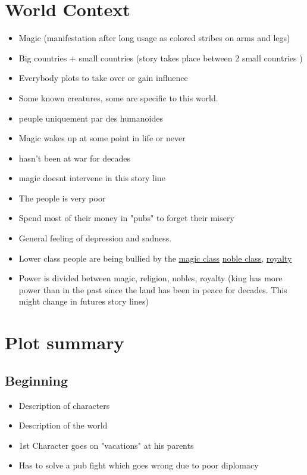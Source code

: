 \documentclass{article}
\begin{document}
\section{World Context}
\begin{itemize}
\item{Magic (manifestation after long usage as colored stribes on arms and legs)}
\item{Big countries + small countries (story takes place between 2 small countries )}
\item{Everybody plots to take over or gain influence}
\item{Some known creatures, some are specific to this world.}
\item{peuple uniquement par des humanoides}
\item{Magic wakes up at some point in life or never}
\item{hasn't been at war for decades}
\item{magic doesnt intervene in this story line}
\item{The people is very poor}
\item{Spend most of their money in "pubs" to forget their misery}
\item{General feeling of depression and sadness.}
\item{Lower class people are being bullied by the \underline{magic class} \underline{noble class}, \underline{royalty}}
\item{Power is divided between magic, religion, nobles, royalty (king has more power than in the past since the land has been in peace for decades. This might change in futures story lines)}
\end{itemize}

\section{Plot summary}
	\subsection{Beginning}
		\begin{itemize}
		\item{Description of characters}
		\item{Description of the world}
		\item{1st Character goes on "vacations" at his parents}
		\item{Has to solve a pub fight which goes wrong due to poor diplomacy}
		\end{itemize}
\end{document}
